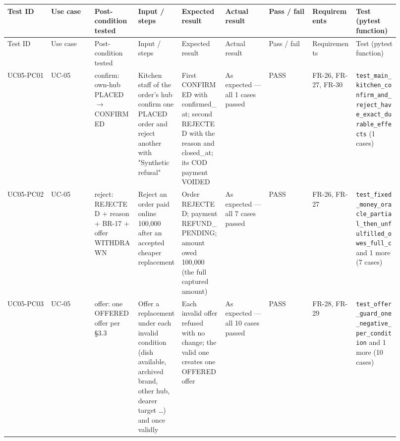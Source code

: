 \begin{landscape}
\begingroup\footnotesize
\begin{longtable}{>{\raggedright\arraybackslash}p{0.1022\linewidth}>{\raggedright\arraybackslash}p{0.1022\linewidth}>{\raggedright\arraybackslash}p{0.1022\linewidth}>{\raggedright\arraybackslash}p{0.1022\linewidth}>{\raggedright\arraybackslash}p{0.1022\linewidth}>{\raggedright\arraybackslash}p{0.1022\linewidth}>{\raggedright\arraybackslash}p{0.1022\linewidth}>{\raggedright\arraybackslash}p{0.1022\linewidth}>{\raggedright\arraybackslash}p{0.1022\linewidth}}
Test ID & Use case & Post-condition tested & Input / steps & Expected result & Actual result & Pass / fail & Requirements & Test (pytest function) \\
\hline\endfirsthead
Test ID & Use case & Post-condition tested & Input / steps & Expected result & Actual result & Pass / fail & Requirements & Test (pytest function) \\
\hline\endhead
UC05-PC01 & UC-05 & confirm: own-hub PLACED \ensuremath{\rightarrow} CONFIRMED & Kitchen staff of the order's hub confirm one PLACED order and reject another with "Synthetic refusal" & First CONFIRMED with confirmed\_at; second REJECTED with the reason and closed\_at; its COD payment VOIDED & As expected --- all 1 cases passed & PASS & FR-26, FR-27, FR-30 & \texttt{test\_\allowbreak{}main\_\allowbreak{}kitchen\_\allowbreak{}confirm\_\allowbreak{}and\_\allowbreak{}reject\_\allowbreak{}have\_\allowbreak{}exact\_\allowbreak{}durable\_\allowbreak{}effects} (1 cases) \\
UC05-PC02 & UC-05 & reject: REJECTED + reason + BR-17 + offer WITHDRAWN & Reject an order paid online 100,000 after an accepted cheaper replacement & Order REJECTED; payment REFUND\_PENDING; amount owed 100,000 (the full captured amount) & As expected --- all 7 cases passed & PASS & FR-26, FR-27 & \texttt{test\_\allowbreak{}fixed\_\allowbreak{}money\_\allowbreak{}oracle\_\allowbreak{}partial\_\allowbreak{}then\_\allowbreak{}unfulfilled\_\allowbreak{}owes\_\allowbreak{}full\_\allowbreak{}c} and 1 more (7 cases) \\
UC05-PC03 & UC-05 & offer: one OFFERED offer per \S{}3.3 & Offer a replacement under each invalid condition (dish available, archived brand, other hub, dearer target \ldots{}) and once validly & Each invalid offer refused with no change; the valid one creates one OFFERED offer & As expected --- all 10 cases passed & PASS & FR-28, FR-29 & \texttt{test\_\allowbreak{}offer\_\allowbreak{}guard\_\allowbreak{}one\_\allowbreak{}negative\_\allowbreak{}per\_\allowbreak{}condition} and 1 more (10 cases) \\

\end{longtable}
\end{landscape}
